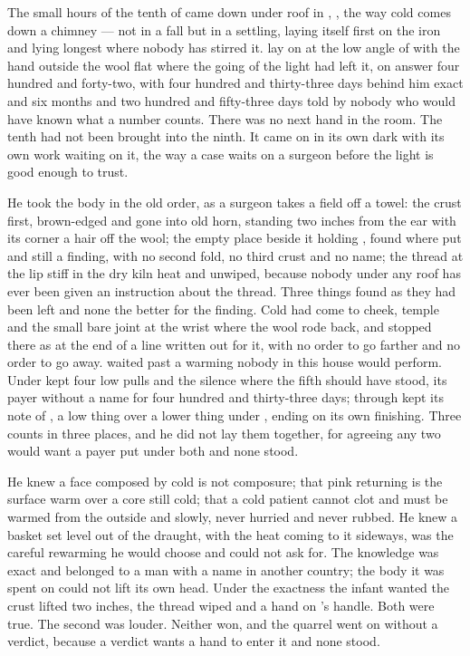
The small hours of the tenth of  came down under  roof in , ,  the way cold comes down a chimney --- not in a fall but in a settling, laying itself first on the iron and lying longest where nobody has stirred it.  lay on  at the low angle of  with the hand outside the wool flat where the going of the light had left it, on answer four hundred and forty-two, with four hundred and thirty-three days behind him exact and six months and two hundred and fifty-three days told by nobody who would have known what a number counts. There was no next hand in the room. The tenth had not been brought into the ninth. It came on in its own dark with its own work waiting on it, the way a case waits on a surgeon before the light is good enough to trust.

He took the body in the old order, as a surgeon takes a field off a towel: the crust first, brown-edged and gone into old horn, standing two inches from the ear with its corner a hair off the wool; the empty place beside it holding , found where put and still a finding, with no second fold, no third crust and no name; the thread at the lip stiff in the dry kiln heat and unwiped, because nobody under any roof has ever been given an instruction about the thread. Three things found as they had been left and none the better for the finding. Cold had come to cheek, temple and the small bare joint at the wrist where the wool rode back, and stopped there as at the end of a line written out for it, with no order to go farther and no order to go away.  waited past a warming nobody in this house would perform. Under   kept four low pulls and the silence where the fifth should have stood, its payer without a name for four hundred and thirty-three days; through   kept its note of , a low thing over a lower thing under , ending on its own finishing. Three counts in three places, and he did not lay them together, for agreeing any two would want a payer put under both and none stood.

He knew a face composed by cold is not composure; that pink returning is the surface warm over a core still cold; that a cold patient cannot clot and must be warmed from the outside and slowly, never hurried and never rubbed. He knew a basket set level out of the draught, with the heat coming to it sideways, was the careful rewarming he would choose and could not ask for. The knowledge was exact and belonged to a man with a name in another country; the body it was spent on could not lift its own head. Under the exactness the infant wanted the crust lifted two inches, the thread wiped and a hand on 's handle. Both were true. The second was louder. Neither won, and the quarrel went on without a verdict, because a verdict wants a hand to enter it and none stood.

